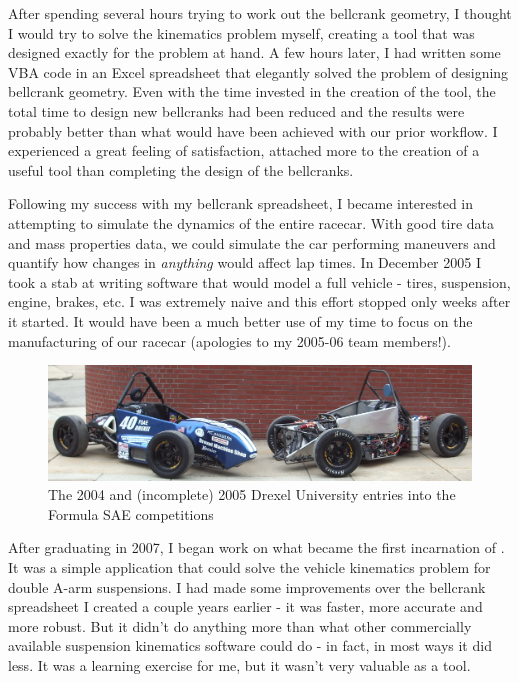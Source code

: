After spending several hours trying to work out the bellcrank geometry, I thought I would try to solve the kinematics problem myself, creating a tool that was designed exactly for the problem at hand.  A few hours later, I had written some VBA code in an Excel spreadsheet that elegantly solved the problem of designing bellcrank geometry.  Even with the time invested in the creation of the tool, the total time to design new bellcranks had been reduced and the results were probably better than what would have been achieved with our prior workflow.  I experienced a great feeling of satisfaction, attached more to the creation of a useful tool than completing the design of the bellcranks.

Following my success with my bellcrank spreadsheet, I became interested in attempting to simulate the dynamics of the entire racecar.  With good tire data and mass properties data, we could simulate the car performing maneuvers and quantify how changes in \emph{anything} would affect lap times.  In December 2005 I took a stab at writing software that would model a full vehicle - tires, suspension, engine, brakes, etc.  I was extremely naive and this effort stopped only weeks after it started.  It would have been a much better use of my time to focus on the manufacturing of our racecar (apologies to my 2005-06 team members!).

\begin{figure}
\includegraphics[width=\textwidth]{images/04-05cars}
\caption{The 2004 and (incomplete) 2005 Drexel University entries into the Formula SAE competitions}
\centering
\end{figure}

After graduating in 2007, I began work on what became the first incarnation of \vvase{}.  It was a simple application that could solve the vehicle kinematics problem for double A-arm suspensions.  I had made some improvements over the bellcrank spreadsheet I created a couple years earlier - it was faster, more accurate and more robust.  But it didn't do anything more than what other commercially available suspension kinematics software could do - in fact, in most ways it did less.  It was a learning exercise for me, but it wasn't very valuable as a tool.

